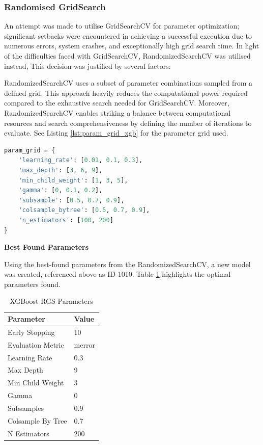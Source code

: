 \subsubsection*{Randomised GridSearch}

An attempt was made to utilise GridSearchCV for parameter optimization; significant setbacks were encountered in achieving a successful execution due to numerous errors, system crashes, and exceptionally high grid search time. In light of the difficulties faced with GridSearchCV, RandomizedSearchCV was utilised instead, This decision was justified by several factors:

RandomizedSearchCV uses a subset of parameter combinations sampled from a defined grid. This approach heavily reduces the computational power required compared to the exhaustive search needed for GridSearchCV. Moreover, RandomizedSearchCV enables striking a balance between computational resources and search comprehensiveness by defining the number of iterations to evaluate. See Listing \ref{lst:param_grid_xgb} for the parameter grid used.

\medskip

\begin{lstlisting}[language=Python, caption={Grid Search Parameters For XGBoost}, label= lst:param_grid_xgb]
param_grid = {
    'learning_rate': [0.01, 0.1, 0.3],
    'max_depth': [3, 6, 9],
    'min_child_weight': [1, 3, 5],
    'gamma': [0, 0.1, 0.2],
    'subsample': [0.5, 0.7, 0.9],
    'colsample_bytree': [0.5, 0.7, 0.9],
    'n_estimators': [100, 200]
}
\end{lstlisting}

\textbf{Best Found Parameters}
\medskip

Using the best-found parameters from the RandomizedSearchCV, a new model was created, referenced above as ID 1010. Table \ref{tab:xg_rgs_parameters} highlights the optimal parameters found.

\begin{table}[h]
\captionsetup{justification=centering} 
\centering
\caption{XGBoost RGS Parameters}
\begin{tabular}{ll}
\hline
\textbf{Parameter} & \textbf{Value} \\ \hline
Early Stopping & 10 \\
Evaluation Metric & merror \\
Learning Rate & 0.3 \\
Max Depth & 9 \\
Min Child Weight & 3 \\
Gamma & 0 \\
Subsamples & 0.9 \\
Colsample By Tree & 0.7 \\
N Estimators & 200 \\ \hline
\end{tabular}
\label{tab:xg_rgs_parameters}
\end{table}


